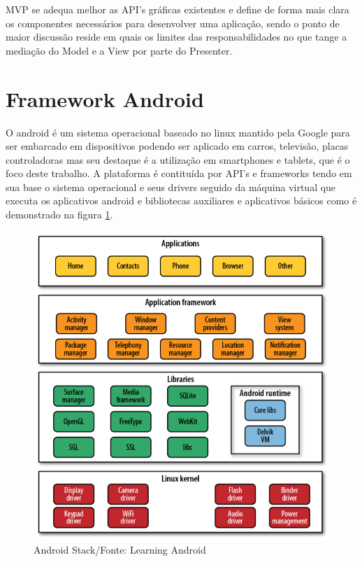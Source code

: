 MVP se adequa melhor as API's gráficas existentes e define de forma mais clara
os componentes necessários para desenvolver uma aplicação, sendo o ponto de maior
discussão reside em quais os limites das responsabilidades no que tange a
mediação do Model e a View por parte do Presenter.

\section{Framework Android}
 

O android é um sistema operacional baseado no linux mantido pela Google para
ser embarcado em dispositivos podendo ser aplicado em carros, televisão, placas
controladoras mas seu destaque é a utilização em smartphones e
tablets, que é o foco deste trabalho. A plataforma é contituída por API's e
frameworks tendo em sua base o sistema operacional e seus drivers seguido da
máquina virtual que executa os aplicativos android e bibliotecas auxiliares e
aplicativos básicos como é demonstrado na figura \ref{android_stack}.

\begin{figure}[h]
	\centering
	\includegraphics[scale=0.5]{img/android_stack.png}
	\caption{Android Stack/Fonte: Learning Android}
	\label{android_stack}
\end{figure}

